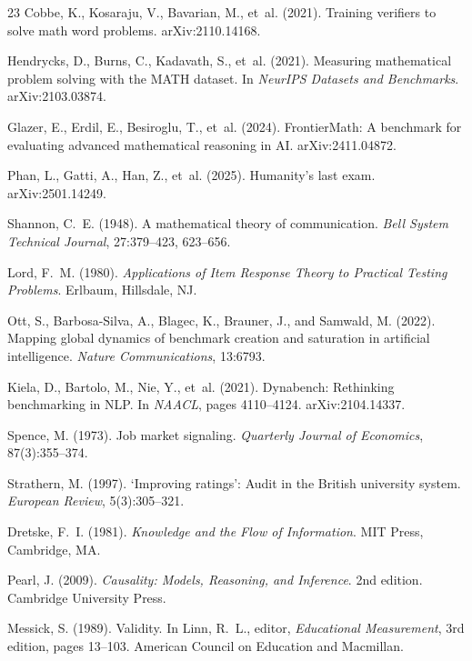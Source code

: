 \documentclass[11pt,UTF8]{ctexart}
\theoremstyle{definition}
\begin{document}
\begin{thebibliography}{23}
Cobbe, K., Kosaraju, V., Bavarian, M., et~al. (2021). Training verifiers
to solve math word problems. arXiv:2110.14168.

Hendrycks, D., Burns, C., Kadavath, S., et~al. (2021). Measuring
mathematical problem solving with the {MATH} dataset. In \emph{NeurIPS
Datasets and Benchmarks}. arXiv:2103.03874.

Glazer, E., Erdil, E., Besiroglu, T., et~al. (2024). {FrontierMath}: A
benchmark for evaluating advanced mathematical reasoning in {AI}.
arXiv:2411.04872.

Phan, L., Gatti, A., Han, Z., et~al. (2025). Humanity's last exam.
arXiv:2501.14249.

Shannon, C.~E. (1948). A mathematical theory of communication.
\emph{Bell System Technical Journal}, 27:379--423, 623--656.

Lord, F.~M. (1980). \emph{Applications of Item Response Theory to
Practical Testing Problems}. Erlbaum, Hillsdale, NJ.

Ott, S., Barbosa-Silva, A., Blagec, K., Brauner, J., and Samwald, M.
(2022). Mapping global dynamics of benchmark creation and saturation in
artificial intelligence. \emph{Nature Communications}, 13:6793.

Kiela, D., Bartolo, M., Nie, Y., et~al. (2021). Dynabench: Rethinking
benchmarking in {NLP}. In \emph{NAACL}, pages 4110--4124.
arXiv:2104.14337.

Spence, M. (1973). Job market signaling. \emph{Quarterly Journal of
Economics}, 87(3):355--374.

Strathern, M. (1997). `{Improving} ratings': Audit in the {British}
university system. \emph{European Review}, 5(3):305--321.

Dretske, F.~I. (1981). \emph{Knowledge and the Flow of Information}.
MIT Press, Cambridge, MA.

Pearl, J. (2009). \emph{Causality: Models, Reasoning, and Inference}.
2nd edition. Cambridge University Press.

Messick, S. (1989). Validity. In Linn, R.~L., editor, \emph{Educational
Measurement}, 3rd edition, pages 13--103. American Council on
Education and Macmillan.

\end{thebibliography}
\end{document}
